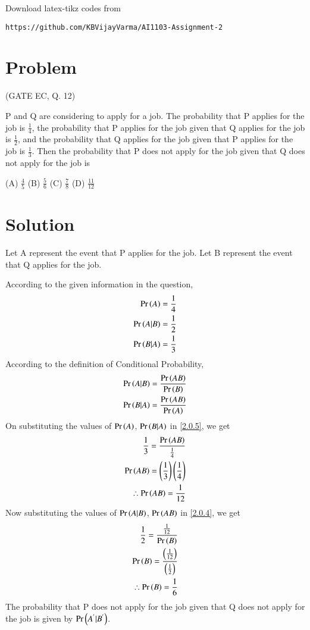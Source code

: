 \documentclass[journal,12pt,twocolumn]{IEEEtran}
\begin{document}
%
Download latex-tikz codes from 
%
\begin{lstlisting}
https://github.com/KBVijayVarma/AI1103-Assignment-2
\end{lstlisting}
\section{Problem}
(GATE EC, Q. 12) 

P and Q are considering to apply for a job. The probability that P applies for the job is $\frac{1}{4}$, the probability that P applies for the job given that Q applies for the job is $\frac{1}{2}$, and the probability that Q applies for the job given that P applies for the job is $\frac{1}{3}$. Then the probability that P does not apply for the job given that Q does not apply for the job is

(A) $\frac{4}{5}$    (B) $\frac{5}{6}$    (C) $\frac{7}{8}$    (D) $\frac{11}{12}$

\section{Solution}
Let A represent the event that P applies for the job. Let B represent the event that Q applies for the job. 

According to the given information in the question,
\begin{align}
\Pr\left(A\right) = \frac{1}{4} \\
\Pr\left(A|B\right) = \frac{1}{2} \\
\Pr\left(B|A\right) = \frac{1}{3} 
\end{align}
According to the definition of Conditional Probability,
\begin{align}
\Pr\left(A|B\right) = \frac{\Pr\left(AB\right)}{\Pr\left(B\right)} \label{2.0.4} \\
\Pr\left(B|A\right) = \frac{\Pr\left(AB\right)}{\Pr\left(A\right)} \label{2.0.5}
\end{align}
On substituting the values of $\Pr\left(A\right)$, $\Pr\left(B|A\right)$ in \eqref{2.0.5}, we get
\begin{align}
\frac{1}{3} = \frac{\Pr\left(AB\right)}{\frac{1}{4}} \\
\Pr\left(AB\right) = \left(\frac{1}{3} \right) \left(\frac{1}{4} \right) \\
\therefore \Pr\left(AB\right) = \frac{1}{12}
\end{align}
Now substituting the values of $\Pr\left(A|B\right)$, $\Pr\left(AB\right)$ in \eqref{2.0.4}, we get
\begin{align}
\frac{1}{2} = \frac{\frac{1}{12}}{\Pr\left(B\right)} \\
\Pr\left(B\right) = \frac{\left(\frac{1}{12} \right)}{\left(\frac{1}{2} \right)} \\
\therefore \Pr\left(B\right) = \frac{1}{6}
\end{align}
The probability that P does not apply for the job given that Q does not apply for the job is given by $\Pr\left(A^{'}|B^{'}\right)$.
\end{document}

